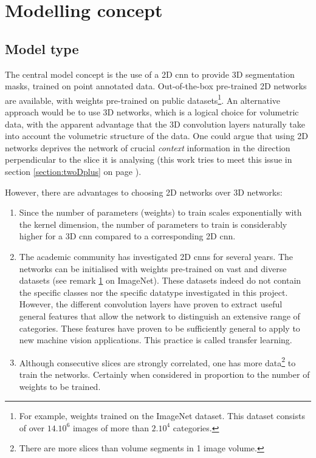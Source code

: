 \section{Modelling concept\label{sec:model_concept}}

\subsection{Model type}
\par{
    The central model concept is the use of a 2D \acrfull{cnn} to provide 3D segmentation masks, trained on point annotated data.
    Out-of-the-box pre-trained 2D networks are available, with weights pre-trained on public datasets\footnote{\label{footnote:Imagenet}For example, weights trained on the ImageNet dataset. 
    This dataset consists of over $14.10^6$ images of more than $2.10^4$ categories.}.
    An alternative approach would be to use 3D networks, which is a logical choice for volumetric data, with the apparent advantage that the 3D convolution layers naturally take into account the volumetric structure of the data.
    One could argue that using 2D networks deprives the network of crucial \textit{context} information in the direction perpendicular to the slice it is analysing (this work tries to meet this issue in section \ref{section:twoDplus} on page \pageref{section:twoDplus}).     
}

However, there are advantages to choosing 2D networks over 3D networks:
\begin{enumerate}
    \item Since the number of parameters (weights) to train scales exponentially with the kernel dimension, the number of parameters to train is considerably higher for a 3D \acrshort{cnn} compared to a corresponding 2D \acrshort{cnn}.
    \item The academic community has investigated 2D \acrlong{cnn}s for several years. The networks can be initialised with weights pre-trained on vast and diverse datasets (see remark \ref{footnote:Imagenet} on ImageNet). 
    These datasets indeed do not contain the specific classes nor the specific datatype investigated in this project. 
    However, the different convolution layers have proven to extract useful general features that allow the network to distinguish an extensive range of categories. 
    These features have proven to be sufficiently general to apply to new machine vision applications. This practice is called transfer learning.
    \item Although consecutive slices are strongly correlated, one has more data\footnote{There are more slices than volume segments in 1 image volume.} to train the networks. Certainly when considered in proportion to the number of weights to be trained.
\end{enumerate}

